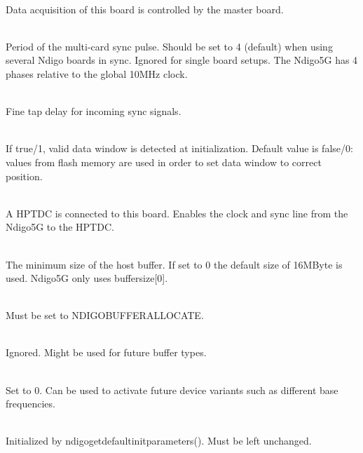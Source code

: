            \\
            Data acquisition of this board is controlled by the master board.\par

            \\
            Period of the multi-card sync pulse. Should be set to 4 (default) when using several Ndigo boards in sync. Ignored for single board setups. The Ndigo5G has 4 phases relative to the global 10MHz clock.\par

            \\
            Fine tap delay for incoming sync signals.\par

            \\
            If true/1, valid data window is detected at initialization. Default value is false/0: values from flash memory are used in order to set data window to correct position.

            \\
            A HPTDC is connected to this board. Enables the clock and sync line from the Ndigo5G to the HPTDC.\par

            \\
            The minimum size of the host buffer. If set to 0 the default size of 16MByte is used. Ndigo5G only uses \textsf{buffer\tu size[0]}.\par

            \\
            Must be set to \textsf{NDIGO\tu BUFFER\tu ALLOCATE}.\par

            \\
            Ignored. Might be used for future buffer types.\par

            \\
            Set to 0. Can be used to activate future device variants such as different base frequencies.\par

            \\
            Initialized by \textsf{ndigo\tu get\tu default\tu init\tu parameters()}. Must be left unchanged.

